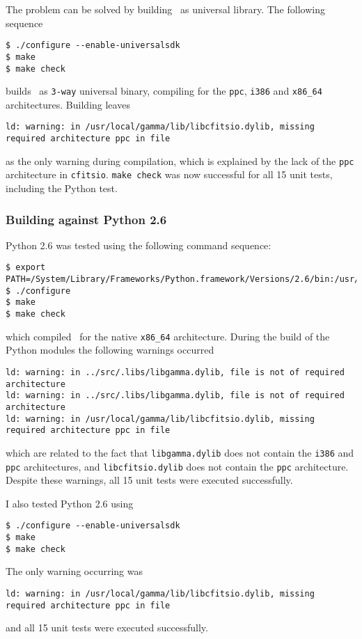 \documentclass{article}[12pt,a4]
\begin{document}
The problem can be solved by building \this\ as universal library.
The following sequence
{\small\begin{verbatim}
$ ./configure --enable-universalsdk
$ make
$ make check
\end{verbatim}}
builds \this\ as {\tt 3-way} universal binary, compiling for the {\tt ppc}, {\tt i386} and
{\tt x86\_64} architectures.
Building leaves
{\small\begin{verbatim}
ld: warning: in /usr/local/gamma/lib/libcfitsio.dylib, missing required architecture ppc in file
\end{verbatim}}
as the only warning during compilation, which is explained by the lack of the {\tt ppc} 
architecture in {\tt cfitsio}.
{\tt make check} was now successful for all 15 unit tests, including the Python test.


\subsubsection{Building against Python 2.6}

Python 2.6 was tested using the following command sequence:
{\small\begin{verbatim}
$ export PATH=/System/Library/Frameworks/Python.framework/Versions/2.6/bin:/usr/bin:/bin:/usr/sbin:/sbin
$ ./configure
$ make
$ make check
\end{verbatim}}
which compiled \this\ for the native {\tt x86\_64} architecture.
During the build of the Python modules the following warnings occurred
{\small\begin{verbatim}
ld: warning: in ../src/.libs/libgamma.dylib, file is not of required architecture
ld: warning: in ../src/.libs/libgamma.dylib, file is not of required architecture
ld: warning: in /usr/local/gamma/lib/libcfitsio.dylib, missing required architecture ppc in file
\end{verbatim}}
which are related to the fact that {\tt libgamma.dylib} does not contain the
{\tt i386} and {\tt ppc} architectures, and {\tt libcfitsio.dylib} does not contain the
{\tt ppc} architecture.
Despite these warnings, all 15 unit tests were executed successfully.

I also tested Python 2.6 using
{\small\begin{verbatim}
$ ./configure --enable-universalsdk
$ make
$ make check
\end{verbatim}}
The only warning occurring was
{\small\begin{verbatim}
ld: warning: in /usr/local/gamma/lib/libcfitsio.dylib, missing required architecture ppc in file
\end{verbatim}}
and all 15 unit tests were executed successfully.
\end{document}
